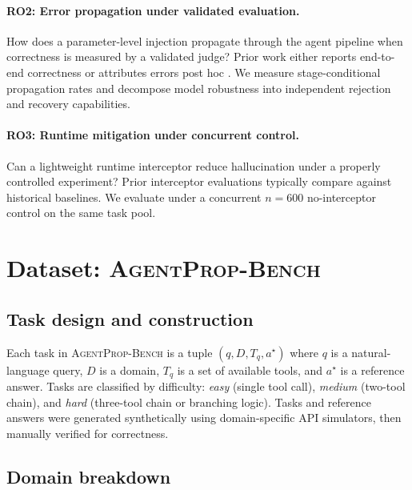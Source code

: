 \documentclass{article}
\newcommand{\bench}{\textsc{AgentProp-Bench}\xspace}
\begin{document}
\paragraph{RO2: Error propagation under validated evaluation.}
How does a parameter-level injection propagate through the agent
pipeline when correctness is measured by a validated judge?
Prior work either reports end-to-end correctness or attributes
errors post hoc \citep{liu2026agenthallu}.
We measure stage-conditional propagation rates and decompose model
robustness into independent rejection and recovery capabilities.

\paragraph{RO3: Runtime mitigation under concurrent control.}
Can a lightweight runtime interceptor reduce hallucination under a
properly controlled experiment?
Prior interceptor evaluations \citep{wang2026agentspec} typically
compare against historical baselines.
We evaluate under a concurrent $n{=}600$ no-interceptor control on
the same task pool.


\section{Dataset: \bench{}}
\label{sec:dataset}

\subsection{Task design and construction}

Each task in \bench{} is a tuple $(q, D, T_q, a^\star)$ where $q$ is a
natural-language query, $D$ is a domain, $T_q$ is a set of available
tools, and $a^\star$ is a reference answer.
Tasks are classified by difficulty: \emph{easy} (single tool call),
\emph{medium} (two-tool chain), and \emph{hard} (three-tool chain or
branching logic).
Tasks and reference answers were generated synthetically using
domain-specific API simulators, then manually verified for correctness.

\subsection{Domain breakdown}
\end{document}
